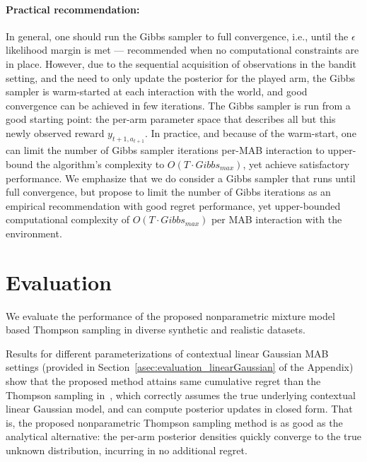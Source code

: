 \documentclass{article}
\newcommand{\ie}{i.e., }
\begin{document}
\vspace*{-2ex}
\paragraph{Practical recommendation:} In general, one should run the Gibbs sampler to full convergence, \ie until the $\epsilon$ likelihood margin is met --- recommended when no computational constraints are in place. However, due to the sequential acquisition of observations in the bandit setting, and the need to only update the posterior for the played arm, the Gibbs sampler is warm-started at each interaction with the world, and good convergence can be achieved in few iterations. The Gibbs sampler is run from a good starting point: the per-arm parameter space that describes all but this newly observed reward $y_{t+1,a_{t+1}}$. In practice, and because of the warm-start, one can limit the number of Gibbs sampler iterations per-MAB interaction to upper-bound the algorithm's complexity to $O(T\cdot Gibbs_{max})$, yet achieve satisfactory performance. We emphasize that we do consider a Gibbs sampler that runs until full convergence, but propose to limit the number of Gibbs iterations as an empirical recommendation with good regret performance, yet upper-bounded computational complexity of $O(T \cdot Gibbs_{max})$ per MAB interaction with the environment.

\section{Evaluation}
\label{sec:evaluation}

We evaluate the performance of the proposed nonparametric mixture model based Thompson sampling in diverse synthetic and realistic datasets.

Results for different parameterizations of contextual linear Gaussian MAB settings (provided in Section~\ref{asec:evaluation_linearGaussian} of the Appendix) show that the proposed method attains same cumulative regret than the Thompson sampling in~\cite{j-Agrawal2012}, which correctly assumes the true underlying contextual linear Gaussian model, and can compute posterior updates in closed form. That is, the proposed nonparametric Thompson sampling method is as good as the analytical alternative: the per-arm posterior densities quickly converge to the true unknown distribution, incurring in no additional regret.
\end{document}
